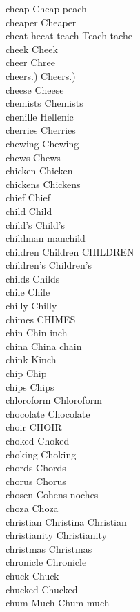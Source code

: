 cheap Cheap peach\\
cheaper Cheaper\\
cheat hecat teach Teach tache\\
cheek Cheek\\
cheer Chree\\
cheers.) Cheers.)\\
cheese Cheese\\
chemists Chemists\\
chenille Hellenic\\
cherries Cherries\\
chewing Chewing\\
chews Chews\\
chicken Chicken\\
chickens Chickens\\
chief Chief\\
child Child\\
child's Child's\\
childman manchild\\
children Children CHILDREN\\
children's Children's\\
childs Childs\\
chile Chile\\
chilly Chilly\\
chimes CHIMES\\
chin Chin inch\\
china China chain\\
chink Kinch\\
chip Chip\\
chips Chips\\
chloroform Chloroform\\
chocolate Chocolate\\
choir CHOIR\\
choked Choked\\
choking Choking\\
chords Chords\\
chorus Chorus\\
chosen Cohens noches\\
choza Choza\\
christian Christina Christian\\
christianity Christianity\\
christmas Christmas\\
chronicle Chronicle\\
chuck Chuck\\
chucked Chucked\\
chum Much Chum much\\
